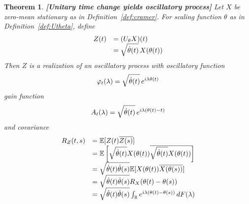 \documentclass{article}
\newcommand{\tmstrong}[1]{\textbf{#1}}
\newtheorem{theorem}{Theorem}
\begin{document}
\begin{theorem}
  {\tmstrong{[Unitary time change yields oscillatory
  process]\label{thm:Utheta_to_osc}}} Let $X$ be zero-mean stationary as in
  Definition~\ref{def:cramer}. For scaling function $\theta$ as in
  Definition~\ref{def:Utheta}, define
  \begin{equation}
    \begin{array}{ll}
      Z (t) & = (U_{\theta} X) (t)\\
      & = \sqrt{\dot{\theta} (t)}  \hspace{0.17em} X (\theta (t))
    \end{array}
  \end{equation}
  Then $Z$ is a realization of an oscillatory process with oscillatory
  function
  \begin{equation}
    \varphi_t (\lambda) = \sqrt{\dot{\theta} (t)}  \hspace{0.17em} e^{i
    \lambda \theta (t)}
  \end{equation}
  gain function
  \begin{equation}
    A_t (\lambda) = \sqrt{\dot{\theta} (t)}  \hspace{0.17em} e^{i \lambda
    (\theta (t) - t)}
  \end{equation}
  and covariance
  \begin{equation}
    \begin{array}{ll}
      R_Z (t, s) & =\mathbb{E} [Z (t) \overline{Z (s)}]\\
      & =\mathbb{E} \left[ \sqrt{\dot{\theta} (t)} X (\theta (t))
      \overline{\sqrt{\dot{\theta} (t)} X (\theta (t))} \right]\\
      & = \sqrt{\dot{\theta} (t)  \dot{\theta} (s)} \mathbb{E} [X (\theta
      (t)) \overline{X (\theta (s))}]\\
      & = \sqrt{\dot{\theta} (t)  \dot{\theta} (s)} R_X  (\theta (t) - \theta
      (s))\\
      & = \sqrt{\dot{\theta} (t)  \dot{\theta} (s)}  \int_{\mathbb{R}} e^{i
      \lambda (\theta (t) - \theta (s))}  \hspace{0.17em} dF (\lambda)
    \end{array} \label{osccovar}
  \end{equation}
\end{theorem}
\end{document}
